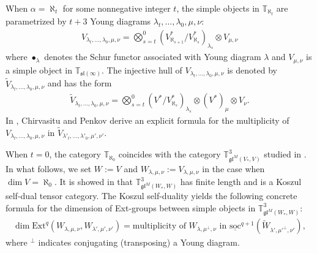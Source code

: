 \documentclass[openany, a4paper]{amsbook}
\theoremstyle{definition}
\numberwithin{equation}{chapter}
\newcommand{\T}[1]{{\mathbb{T}}_{\aleph_{#1}}}
\newcommand{\socl}[2]{\underline{\mathrm{soc}}^{#1}({#2})}
\newcommand{\Ext}[4]{\mathrm{Ext}^{#1}_{#2}({#3}, {#4})}
\begin{document}
When $\alpha = \aleph_t$ for some nonnegative integer $t$, 
the simple objects in $\T{t}$ are parametrized by $t+3$ Young diagrams $\lambda_t, ..., \lambda_0, \mu, \nu$:
\begin{align}
    V_{\lambda_t, ... , \lambda_0, \mu, \nu} = \bigotimes_{s=t}^{0} (V^{\ast}_{\aleph_{s+1}}/V^{\ast}_{\aleph_{s}})_{\lambda_s} \otimes V_{\mu, \nu}
\end{align}
where $\bullet_\lambda$ denotes the Schur functor associated with Young diagram $\lambda$ and $V_{\mu, \nu}$ is a simple object in $\mathbb{T}_{\mathfrak{sl}(\infty)}$. The injective hull of $V_{\lambda_t, ... , \lambda_0, \mu, \nu}$ is denoted by $ \tilde{V}_{\lambda_t, ... , \lambda_0, \mu, \nu}$ and has the form
\begin{align}\label{eq: ext aldep 0}
    \tilde{V}_{\lambda_t, ... , \lambda_0, \mu, \nu} = \bigotimes_{s=t}^{0} (V^{\ast}/V^{\ast}_{\aleph_{s}})_{\lambda_s} \otimes (V^*)_\mu \otimes V_\nu.
\end{align}
In \cite{cp17}, Chirvasitu and Penkov derive an explicit formula for the multiplicity of $V_{\lambda_t, \dots, \lambda_0, \mu, \nu}$ in $\tilde{V}_{\lambda'_t, \dots, \lambda'_0, \mu', \nu'}$. 

When $t = 0$, the category $\T{0}$ coincides with the category $\mathbb{T}^3_{\mathfrak{gl}^M(V_\ast, V)}$ studied in \cite{cp19}. In what follows, we set $W:= V$ and $W_{\lambda, \mu, \nu}:= V_{\lambda, \mu, \nu}$ in the case when $\dim V = \aleph_0$. It is showed in \cite{cp19} that $\mathbb{T}^3_{\mathfrak{gl}^M(W_\ast, W)}$ has finite length and is a Koszul self-dual tensor category. The Koszul self-duality yields the following concrete formula for the dimension of Ext-groups between simple objects in $\mathbb{T}^3_{\mathfrak{gl}^M(W_\ast, W)}$:
\begin{align}
    \dim \Ext{q}{}{W_{\lambda, \mu, \nu}}{W_{\lambda', \mu', \nu'}} = \text{multiplicity of } W_{\lambda, \mu^\perp , \nu} \text{ in } \socl{q+1}{\tilde{W}_{\lambda', \mu'^\perp, \nu'}},
\end{align}
where $^\perp$ indicates conjugating (transposing) a Young diagram. 
\end{document}
